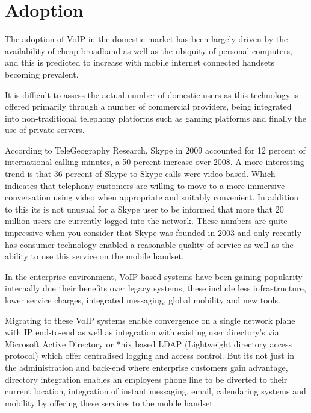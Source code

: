 \section{Adoption}
The adoption of VoIP in the domestic market has been largely driven by the availability of cheap broadband as well as the ubiquity of personal computers, and this is predicted to increase with mobile internet connected handsets becoming prevalent.

It is difficult to assess the actual number of domestic users as this technology is offered primarily through a number of commercial providers, being integrated into non-traditional telephony platforms such as gaming platforms and finally the use of private servers. 

According to TeleGeography Research, Skype in 2009 accounted for 12 percent of international calling minutes, a 50 percent increase over 2008\cite{website:skype_usage}. A more interesting trend is that 36 percent of Skype-to-Skype calls were video based\cite{website:skype_usage}. Which indicates that telephony customers are willing to move to a more immersive conversation using video when appropriate and suitably convenient. In addition to this its is not unusual for a Skype user to be informed that more that 20 million users are currently logged into the network. These numbers are quite impressive when you consider that Skype was founded in 2003 and only recently has consumer technology enabled a reasonable quality of service as well as the ability to use this service on the mobile handset.

In the enterprise environment, VoIP based systems have been gaining popularity internally due their benefits over legacy systems, these include less infrastructure, lower service charges, integrated messaging, global mobility and new tools\cite{website:windows_networking_voip_enterprise}.

Migrating to these VoIP systems enable convergence on a single network plane with IP end-to-end as well as integration with existing user directory's via Microsoft Active Directory or *nix based LDAP (Lightweight directory access protocol) which offer centralised logging and access control. But its not just in the administration and back-end where enterprise customers gain advantage, directory integration enables an employees phone line to be diverted to their current location, integration of instant messaging, email, calendaring systems and mobility by offering these services to the mobile handset.

